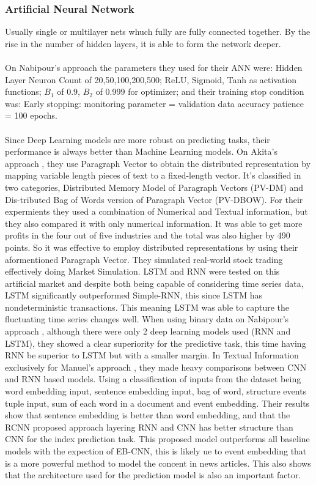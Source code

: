 \documentclass[conference]{IEEEtran}
\begin{document}
\subsubsection{Artificial Neural Network}
Usually single or multilayer nets whuch fully are fully connected together. By the rise in the number of hidden layers, it is able to form the network deeper.
\\\\
On Nabipour's approach \cite{nabipour2020predicting} the parameters they used for their ANN were: Hidden Layer Neuron Count of 20,50,100,200,500; ReLU, Sigmoid, Tanh as activation functions; $B_1$ of 0.9, $B_2$ of 0.999 for optimizer; and their training stop condition
was: Early stopping: monitoring parameter = validation data accuracy patience = 100 epochs.
\\\\
Since Deep Learning models are more robust on predicting tasks, their performance is always better than Machine Learning models.
On Akita's approach \cite{Akita2016}, they use Paragraph Vector to obtain the distributed representation by mapping variable length pieces of text to a fixed-length vector.
It's classified in two categories, Distributed Memory Model of Paragraph Vectors (PV-DM) and Dis-tributed Bag of Words version of Paragraph Vector (PV-DBOW). For their expermients they used a combination of Numerical and Textual
information, but they also compared it with only numerical information. It was able to get more profits in the four out of five industries and the total was also higher by 490 points. So it was effective to employ distributed representations
by using their aformentioned Paragraph Vector. They simulated real-world stock trading effectively doing Market Simulation. LSTM and RNN were tested on this artificial market and despite both being capable of considering time series data, LSTM
significantly outperformed Simple-RNN, this since LSTM has nondeterministic transactions. This meaning LSTM was able to capture the fluctuating time series changes well.
When using binary data on Nabipour's approach \cite{nabipour2020predicting}, although there were only 2 deep learning models used (RNN and LSTM), they showed a clear superiority for the predictive task, this time having RNN be superior to LSTM but with a smaller margin.
In Textual Information exclusively for Manuel's approach \cite{Vargas2017}, they made heavy comparisons between CNN and RNN based models. Using a classification of inputs from the dataset being word embedding input, sentence embedding input, bag of word, structure events tuple input, sum of each word in a document and event embedding.
Their results show that sentence embedding is better than word embedding, and that the RCNN proposed approach layering RNN and CNN has better structure than CNN for the index prediction task. This proposed model outperforms all baseline models with the expection of EB-CNN, this is likely ue to event embedding that is a more powerful method
to model the concent in news articles. This also shows that the architecture used for the prediction model is also an important factor.
\end{document}
